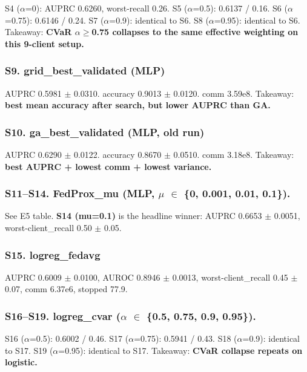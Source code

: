 \documentclass{article}
\begin{document}
S4 (\ensuremath{\alpha}=0): AUPRC 0.6260, worst-recall 0.26. S5 (\ensuremath{\alpha}=0.5): 0.6137 / 0.16. S6 (\ensuremath{\alpha}=0.75): 0.6146 / 0.24. S7 (\ensuremath{\alpha}=0.9): identical to S6. S8 (\ensuremath{\alpha}=0.95): identical to S6. Takeaway: \textbf{CVaR \ensuremath{\alpha}\ensuremath{\geq}0.75 collapses to the same effective weighting on this 9-client setup.}


\subsubsection{S9. grid\_best\_validated (MLP)}

AUPRC 0.5981 \ensuremath{\pm} 0.0310. accuracy 0.9013 \ensuremath{\pm} 0.0120. comm 3.59e8. Takeaway: \textbf{best mean accuracy after search, but lower AUPRC than GA.}


\subsubsection{S10. ga\_best\_validated (MLP, old run)}

AUPRC 0.6290 \ensuremath{\pm} 0.0122. accuracy 0.8670 \ensuremath{\pm} 0.0510. comm 3.18e8. Takeaway: \textbf{best AUPRC + lowest comm + lowest variance.}


\subsubsection{S11--S14. FedProx\_mu (MLP, \ensuremath{\mu} \ensuremath{\in} \{0, 0.001, 0.01, 0.1\}).}

See E5 table. \textbf{S14 (mu=0.1)} is the headline winner: AUPRC 0.6653 \ensuremath{\pm} 0.0051, worst-client\_recall 0.50 \ensuremath{\pm} 0.05.


\subsubsection{S15. logreg\_fedavg}

AUPRC 0.6009 \ensuremath{\pm} 0.0100, AUROC 0.8946 \ensuremath{\pm} 0.0013, worst-client\_recall 0.45 \ensuremath{\pm} 0.07, comm 6.37e6, stopped 77.9.


\subsubsection{S16--S19. logreg\_cvar (\ensuremath{\alpha} \ensuremath{\in} \{0.5, 0.75, 0.9, 0.95\}).}

S16 (\ensuremath{\alpha}=0.5): 0.6002 / 0.46. S17 (\ensuremath{\alpha}=0.75): 0.5941 / 0.43. S18 (\ensuremath{\alpha}=0.9): identical to S17. S19 (\ensuremath{\alpha}=0.95): identical to S17. Takeaway: \textbf{CVaR collapse repeats on logistic.}
\end{document}

